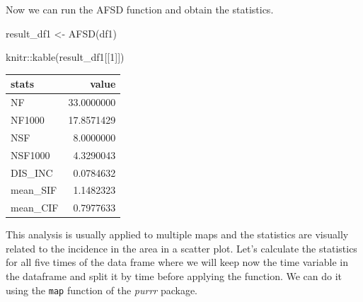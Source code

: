 \documentclass[
  letterpaper,
  DIV=11,
  numbers=noendperiod]{scrreprt}
\newenvironment{Shaded}{\begin{snugshade}}{\end{snugshade}}
\newcommand{\CommentTok}[1]{\textcolor[rgb]{0.37,0.37,0.37}{#1}}
\newcommand{\DecValTok}[1]{\textcolor[rgb]{0.68,0.00,0.00}{#1}}
\newcommand{\FunctionTok}[1]{\textcolor[rgb]{0.28,0.35,0.67}{#1}}
\newcommand{\NormalTok}[1]{\textcolor[rgb]{0.00,0.23,0.31}{#1}}
\newcommand{\OtherTok}[1]{\textcolor[rgb]{0.00,0.23,0.31}{#1}}
\newcommand{\SpecialCharTok}[1]{\textcolor[rgb]{0.37,0.37,0.37}{#1}}
\begin{document}
Now we can run the AFSD function and obtain the statistics.

\begin{Shaded}
\begin{Highlighting}[]
\NormalTok{result\_df1 }\OtherTok{\textless{}{-}} \FunctionTok{AFSD}\NormalTok{(df1)}

\NormalTok{knitr}\SpecialCharTok{::}\FunctionTok{kable}\NormalTok{(result\_df1[[}\DecValTok{1}\NormalTok{]])}
\end{Highlighting}
\end{Shaded}

\begin{longtable}[]{@{}lr@{}}
\toprule\noalign{}
stats & value \\
\midrule\noalign{}
\endhead
\bottomrule\noalign{}
\endlastfoot
NF & 33.0000000 \\
NF1000 & 17.8571429 \\
NSF & 8.0000000 \\
NSF1000 & 4.3290043 \\
DIS\_INC & 0.0784632 \\
mean\_SIF & 1.1482323 \\
mean\_CIF & 0.7977633 \\
\end{longtable}

This analysis is usually applied to multiple maps and the statistics are
visually related to the incidence in the area in a scatter plot. Let's
calculate the statistics for all five times of the data frame where we
will keep now the time variable in the dataframe and split it by time
before applying the function. We can do it using the \texttt{map}
function of the \emph{purrr} package.

\begin{Shaded}
\end{Shaded}
\end{document}
